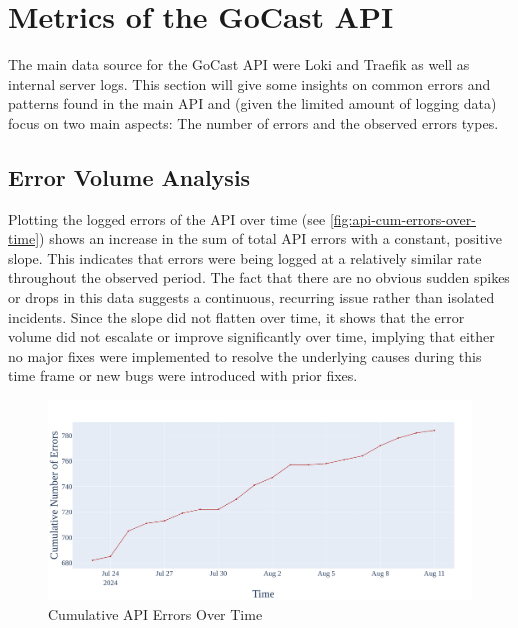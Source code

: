 \section{Metrics of the GoCast API}

The main data source for the GoCast \ac{API} were Loki and Traefik as well as internal server logs. This section will give some insights on common errors and patterns found in the main \ac{API} and (given the limited amount of logging data) focus on two main aspects: The number of errors and the observed errors types.

\subsection{Error Volume Analysis}

Plotting the logged errors of the \ac{API} over time (see \autoref{fig:api-cum-errors-over-time}) shows an increase in the sum of total \ac{API} errors with a constant, positive slope. This indicates that errors were being logged at a relatively similar rate throughout the observed period. The fact that there are no obvious sudden spikes or drops in this data suggests a continuous, recurring issue rather than isolated incidents. Since the slope did not flatten over time, it shows that the error volume did not escalate or improve significantly over time, implying that either no major fixes were implemented to resolve the underlying causes during this time frame or new bugs were introduced with prior fixes.

\begin{figure}[htpb]
    \centering
    \includegraphics[width=\linewidth]{images/plots/api/cum_errors_over_time.png}
    \caption[Cumulative \ac{API} Errors Over Time]{Cumulative \ac{API} Errors Over Time}\label{fig:api-cum-errors-over-time}
\end{figure}


